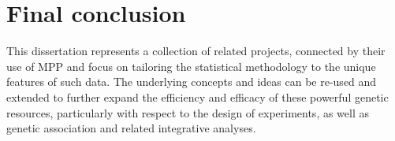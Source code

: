 \section{Final conclusion}

This dissertation represents a collection of related projects, connected by their use of MPP and focus on tailoring the statistical methodology to the unique features of such data. The underlying concepts and ideas can be re-used and extended to further expand the efficiency and efficacy of these powerful genetic resources, particularly with respect to the design of experiments, as well as genetic association and related integrative analyses.



